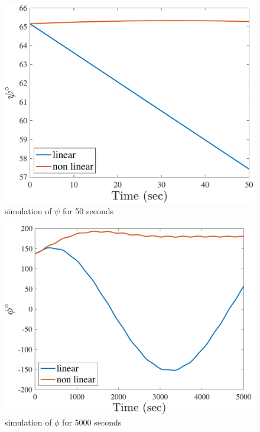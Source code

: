 \begin{figure}[H]
    \caption{simulation of $\psi$ for 50 seconds}
    \centering
    \includegraphics[width=12cm]{../Figure/Q2/psi_50}
\end{figure}

\begin{figure}[H]
    \caption{simulation of $\phi$ for 5000 seconds}
    \centering
    \includegraphics[width=12cm]{../Figure/Q2/phi_5000}
\end{figure}

